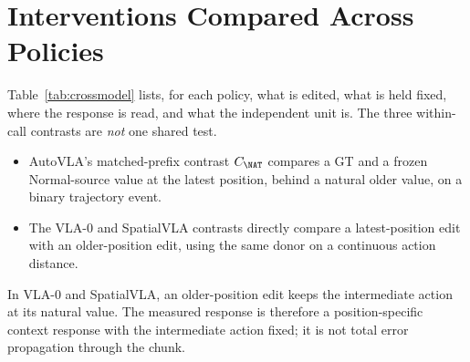 \section{Interventions Compared Across Policies}
\label{sec:crossmodel}
Table~\ref{tab:crossmodel} lists, for each policy, what is edited, what is held fixed, where the response is read, and what the independent unit is. The three within-call contrasts are \emph{not} one shared test.
\begin{itemize}
\item AutoVLA's matched-prefix contrast $C_{\NAT}$ compares a GT and a frozen Normal-source value at the latest position, behind a natural older value, on a binary trajectory event.
\item The VLA-0 and SpatialVLA contrasts directly compare a latest-position edit with an older-position edit, using the same donor on a continuous action distance.
\end{itemize}
In VLA-0 and SpatialVLA, an older-position edit keeps the intermediate action at its natural value. The measured response is therefore a position-specific context response with the intermediate action fixed; it is not total error propagation through the chunk.

